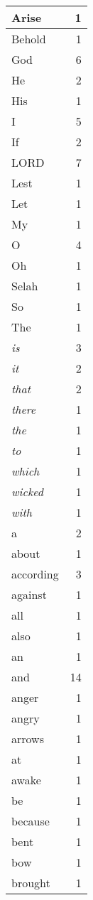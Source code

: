 \begin{center}
\begin{longtable}{l|r}
\hline \hline
\endlastfoot
Arise & 1 \\ \hline
Behold & 1 \\ \hline
God & 6 \\ \hline
He & 2 \\ \hline
His & 1 \\ \hline
I & 5 \\ \hline
If & 2 \\ \hline
LORD & 7 \\ \hline
Lest & 1 \\ \hline
Let & 1 \\ \hline
My & 1 \\ \hline
O & 4 \\ \hline
Oh & 1 \\ \hline
Selah & 1 \\ \hline
So & 1 \\ \hline
The & 1 \\ \hline
\emph{is} & 3 \\ \hline
\emph{it} & 2 \\ \hline
\emph{that} & 2 \\ \hline
\emph{there} & 1 \\ \hline
\emph{the} & 1 \\ \hline
\emph{to} & 1 \\ \hline
\emph{which} & 1 \\ \hline
\emph{wicked} & 1 \\ \hline
\emph{with} & 1 \\ \hline
a & 2 \\ \hline
about & 1 \\ \hline
according & 3 \\ \hline
against & 1 \\ \hline
all & 1 \\ \hline
also & 1 \\ \hline
an & 1 \\ \hline
and & 14 \\ \hline
anger & 1 \\ \hline
angry & 1 \\ \hline
arrows & 1 \\ \hline
at & 1 \\ \hline
awake & 1 \\ \hline
be & 1 \\ \hline
because & 1 \\ \hline
bent & 1 \\ \hline
bow & 1 \\ \hline
brought & 1 \\ \hline

\end{longtable}
\end{center}
